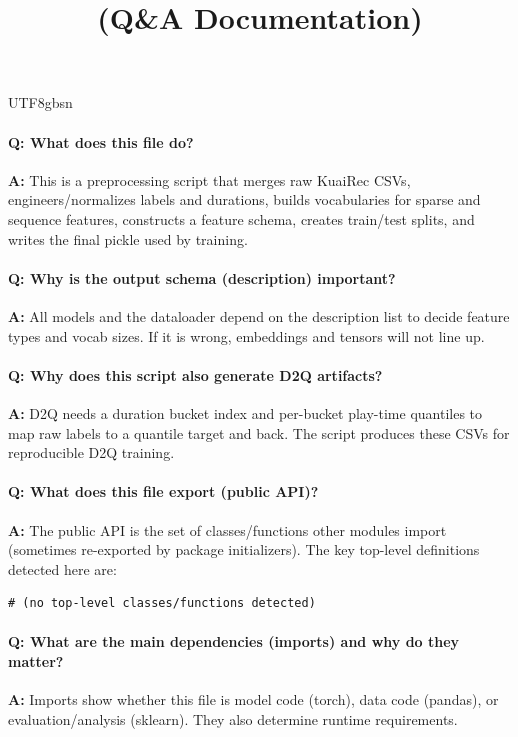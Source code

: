 \documentclass[11pt]{article}
\title{\texttt{\detokenize{dataset/kuairec/kuairec_process.py}} (Q\&A Documentation)}
\author{}
\date{}
\begin{document}
\begin{CJK*}{UTF8}{gbsn}
\maketitle

\paragraph{Q: What does this file do?}
\textbf{A:} This is a preprocessing script that merges raw KuaiRec CSVs, engineers/normalizes labels and durations, builds vocabularies for sparse and sequence features, constructs a feature schema, creates train/test splits, and writes the final pickle used by training.

\paragraph{Q: Why is the output schema (description) important?}
\textbf{A:} All models and the dataloader depend on the description list to decide feature types and vocab sizes. If it is wrong, embeddings and tensors will not line up.

\paragraph{Q: Why does this script also generate D2Q artifacts?}
\textbf{A:} D2Q needs a duration bucket index and per-bucket play-time quantiles to map raw labels to a quantile target and back. The script produces these CSVs for reproducible D2Q training.

\paragraph{Q: What does this file export (public API)?}
\textbf{A:} The public API is the set of classes/functions other modules import (sometimes re-exported by package initializers). The key top-level definitions detected here are:

\begin{Verbatim}[fontsize=\small]
# (no top-level classes/functions detected)
\end{Verbatim}

\paragraph{Q: What are the main dependencies (imports) and why do they matter?}
\textbf{A:} Imports show whether this file is model code (torch), data code (pandas), or evaluation/analysis (sklearn). They also determine runtime requirements.


\end{CJK*}
\end{document}
